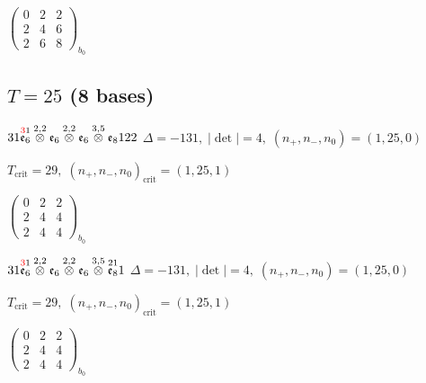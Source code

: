 \documentclass[10pt]{article}
\begin{document}
\hspace{2em}$\left(\begin{smallmatrix}0 & 2 & 2 \\ 2 & 4 & 6 \\ 2 & 6 & 8\end{smallmatrix}\right)_{\!b_0}$


\subsection*{$T = 25$ \quad (8 bases)}
\smallskip

$31\overset{\textcolor{red}{3}1}{\mathfrak{e}_6}\overset{2,2}{\otimes}\mathfrak{e}_6\overset{2,2}{\otimes}\mathfrak{e}_6\overset{3,5}{\otimes}\mathfrak{e}_8122$ \quad $\Delta=-131,\; |\det|=4,\; (n_+,n_-,n_0)=(1,25,0)$

\hspace{1em}$T_{\text{crit}}=29,\; (n_+,n_-,n_0)_{\text{crit}}=(1,25,1)$

\hspace{2em}$\left(\begin{smallmatrix}0 & 2 & 2 \\ 2 & 4 & 4 \\ 2 & 4 & 4\end{smallmatrix}\right)_{\!b_0}$

\smallskip

$31\overset{\textcolor{red}{3}1}{\mathfrak{e}_6}\overset{2,2}{\otimes}\mathfrak{e}_6\overset{2,2}{\otimes}\mathfrak{e}_6\overset{3,5}{\otimes}\overset{21}{\mathfrak{e}_8}1$ \quad $\Delta=-131,\; |\det|=4,\; (n_+,n_-,n_0)=(1,25,0)$

\hspace{1em}$T_{\text{crit}}=29,\; (n_+,n_-,n_0)_{\text{crit}}=(1,25,1)$

\hspace{2em}$\left(\begin{smallmatrix}0 & 2 & 2 \\ 2 & 4 & 4 \\ 2 & 4 & 4\end{smallmatrix}\right)_{\!b_0}$

\smallskip
\end{document}
